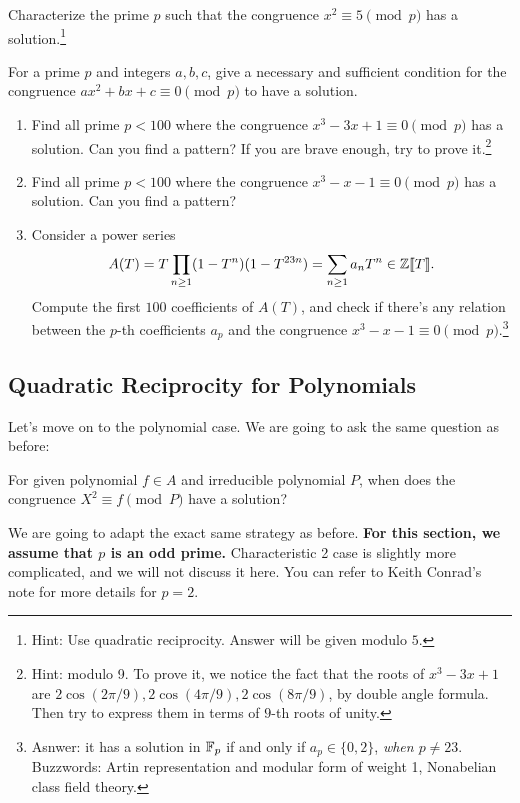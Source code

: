 \begin{exercise}
    Characterize the prime $p$ such that the congruence $x^2 \equiv 5 \pmod{p}$ has a solution.\footnote{Hint: Use quadratic reciprocity. Answer will be given modulo $5$.}
\end{exercise}

\begin{exercise}
    For a prime $p$ and integers $a, b, c$, give a necessary and sufficient condition for the congruence $ax^2 + bx + c \equiv 0 \pmod{p}$ to have a solution.
\end{exercise}

\begin{exercise}
    \begin{enumerate}
        \item Find all prime $p < 100$ where the congruence $x^3 - 3x + 1 \equiv 0 \pmod{p}$ has a solution. Can you find a pattern? If you are brave enough, try to prove it.\footnote{Hint: modulo 9. To prove it, we notice the fact that the roots of $x^3 - 3x + 1$ are $2\cos (2\pi / 9), 2 \cos(4\pi/9), 2\cos(8\pi / 9)$, by double angle formula. Then try to express them in terms of $9$-th roots of unity.}
        \item Find all prime $p < 100$ where the congruence $x^3 - x - 1 \equiv 0 \pmod{p}$ has a solution. Can you find a pattern?
        \item Consider a power series
        \[
        A(T) = T \prod_{n \ge 1} (1 - T^n) (1 - T^{23 n}) = \sum_{n\ge 1} a_n T^n \in \mathbb{Z}\llbracket T \rrbracket.
        \]
        Compute the first $100$ coefficients of $A(T)$, and check if there's any relation between the $p$-th coefficients $a_p$ and the congruence $x^3 - x - 1 \equiv 0 \pmod{p}$.\footnote{Asnwer: it has a solution in $\mathbb{F}_p$ if and only if $a_p \in \{0, 2\}$, \emph{when $p \ne 23$}. Buzzwords: Artin representation and modular form of weight 1, Nonabelian class field theory.}
    \end{enumerate}    
\end{exercise}


\subsection{Quadratic Reciprocity for Polynomials}
\label{subsec:quadratic-reciprocity-polynomials}

Let's move on to the polynomial case.
We are going to ask the same question as before:
\begin{myquote}
For given polynomial $f \in A$ and irreducible polynomial $P$, when does the congruence $X^2 \equiv f \pmod{P}$ have a solution?
\end{myquote}
We are going to adapt the exact same strategy as before.
\textbf{For this section, we assume that $p$ is an odd prime.}
Characteristic 2 case is slightly more complicated, and we will not discuss it here.
You can refer to Keith Conrad's note \cite{conrad_rec_2} for more details for $p = 2$.

